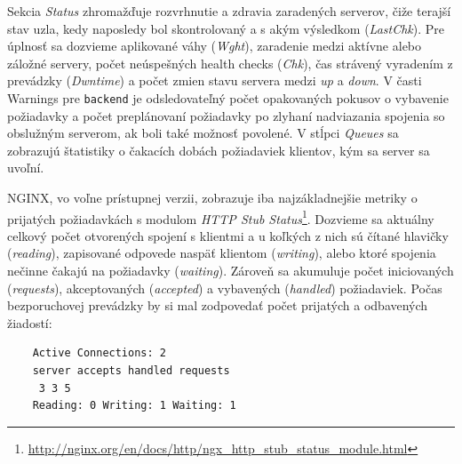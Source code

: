 \documentclass[12pt, a4paper]{article}
\begin{document}
Sekcia \emph{Status} zhromažďuje rozvrhnutie a zdravia zaradených serverov, čiže terajší stav uzla, kedy 
naposledy bol skontrolovaný a s akým výsledkom (\emph{LastChk}). Pre úplnosť sa dozvieme aplikované váhy 
(\emph{Wght}), zaradenie medzi aktívne alebo záložné servery, počet neúspešných health checks (\emph{Chk}), 
čas strávený vyradením z prevádzky (\emph{Dwntime}) a počet zmien stavu servera medzi \emph{up} a 
\emph{down}. V časti Warnings pre \verb|backend| je odsledovateľný počet opakovaných pokusov o vybavenie 
požiadavky a počet preplánovaní požiadavky po zlyhaní nadviazania spojenia so obslužným serverom, 
ak boli také možnosť povolené. V stĺpci \emph{Queues} sa zobrazujú štatistiky o čakacích dobách požiadaviek 
klientov, kým sa server sa uvoľní.

NGINX, vo voľne prístupnej verzii, zobrazuje iba najzákladnejšie metriky o prijatých
požiadavkách s modulom \emph{HTTP Stub Status}\footnote{
\url{http://nginx.org/en/docs/http/ngx_http_stub_status_module.html}}. Dozvieme sa 
aktuálny celkový počet otvorených spojení s klientmi a u koľkých z nich sú čítané hlavičky (\emph{reading}), 
zapisované odpovede naspäť klientom (\emph{writing}), alebo ktoré spojenia nečinne čakajú na 
požiadavky (\emph{waiting}). Zároveň sa akumuluje počet iniciovaných (\emph{requests}), akceptovaných 
(\emph{accepted}) a vybavených (\emph{handled}) požiadaviek. Počas bezporuchovej prevádzky by si mal 
zodpovedať počet prijatých a odbavených žiadostí:
\newpage
\begin{lstlisting}
	Active Connections: 2
	server accepts handled requests
 	 3 3 5
	Reading: 0 Writing: 1 Waiting: 1
\end{lstlisting}
\end{document}
